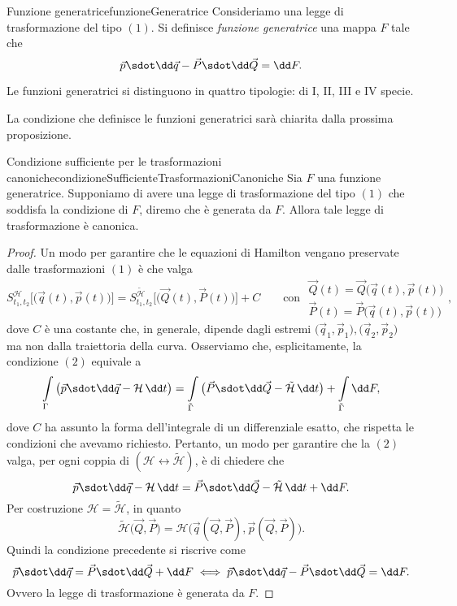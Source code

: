 \begin{defn}{Funzione generatrice}{funzioneGeneratrice}
	Consideriamo una legge di trasformazione del tipo \((1)\). Si definisce \emph{funzione generatrice} una mappa \(F\) tale che
	\[
		\vec{p} \sdot \dd\vec{q} - \vec{P} \sdot \dd\vec{Q} = \dd F.
	\]
\end{defn}

\begin{notz}
	Le funzioni generatrici si distinguono in quattro tipologie:
	di I, II, III e IV specie.
\end{notz}

\begin{oss}
	La condizione che definisce le funzioni generatrici sarà chiarita dalla prossima proposizione.
\end{oss}

\begin{prop}{Condizione sufficiente per le trasformazioni canoniche}{condizioneSufficienteTrasformazioniCanoniche}
	Sia \(F\) una funzione generatrice. Supponiamo di avere una legge di trasformazione del tipo \((1)\) che soddisfa la condizione di \(F\), diremo che è generata da \(F\). Allora tale legge di trasformazione è canonica.
\end{prop}

\begin{proof}
	Un modo per garantire che le equazioni di Hamilton vengano preservate dalle trasformazioni \((1)\) è che valga
	\[
		S_{t_1,t_2}^{\mathcal{H}}\big[\big(\vec{q}(t),\vec{p}(t)\big)\big] = S_{t_1,t_2}^{\tilde{\mathcal{H}}}\big[\big(\vec{Q}(t),\vec{P}(t)\big)\big] + C \qquad\text{con }\begin{matrix}\vec{Q}(t) = \vec{Q}\big(\vec{q}(t),\vec{p}(t)\big) \\[0.5em]
			\vec{P}(t) = \vec{P}\big(\vec{q}(t),\vec{p}(t)\big)\end{matrix},\tag{\(2\)}
	\]
	dove \(C\) è una costante che, in generale, dipende dagli estremi \(\big(\vec{q}_1,\vec{p}_1\big),\big(\vec{q}_2,\vec{p}_2\big)\) ma non dalla traiettoria della curva. Osserviamo che, esplicitamente, la condizione \((2)\) equivale a
	\[
		\int\limits_\Gamma \big(\vec{p}\sdot \dd\vec{q} - \mathcal{H}\,\dd t\big) = \int\limits_{\tilde{\Gamma}} \big(\vec{P} \sdot \dd\vec{Q} - \tilde{\mathcal{H}}\,\dd t\big) + \int\limits_{\tilde{\Gamma}}\dd F,
	\]
	dove \(C\) ha assunto la forma dell'integrale di un differenziale esatto, che rispetta le condizioni che avevamo richiesto.
	Pertanto, un modo per garantire che la \((2)\) valga, per ogni coppia di \((\mathcal{H} \longleftrightarrow \tilde{\mathcal{H}})\), è di chiedere che
	\[
		\vec{p} \sdot \dd\vec{q} - \mathcal{H}\,\dd t = \vec{P} \sdot \dd\vec{Q} - \tilde{\mathcal{H}}\,\dd t + \dd F.
	\]
	Per costruzione \(\mathcal{H}=\tilde{\mathcal{H}}\), in quanto
	\[
		\tilde{\mathcal{H}}\big(\vec{Q},\vec{P}\big) = \mathcal{H}\big(\vec{q}(\vec{Q},\vec{P}),\vec{p}(\vec{Q},\vec{P})\big).
	\]
	Quindi la condizione precedente si riscrive come
	\[
		\vec{p} \sdot \dd\vec{q} = \vec{P} \sdot \dd\vec{Q} + \dd F \iff \vec{p}\sdot \dd\vec{q} - \vec{P}\sdot \dd\vec{Q} = \dd F.
	\]
	Ovvero la legge di trasformazione è generata da \(F\). 
\end{proof}

